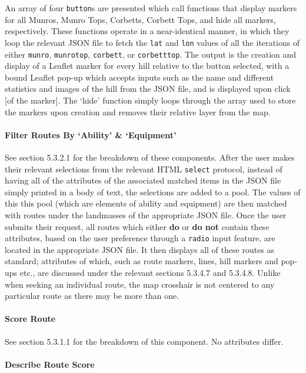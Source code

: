 \documentclass[11pt, english]{article}
\begin{document}
	An array of four \texttt{button}s are presented which call functions that display markers for all Munros, Munro Tops, Corbetts, Corbett Tops, and hide all markers, respectively. These functions operate in a near-identical manner, in which they loop the relevant JSON file to fetch the \texttt{lat} and \texttt{lon} values of all the iterations of either \texttt{munro}, \texttt{munrotop}, \texttt{corbett}, or \texttt{corbetttop}. The output is the creation and display of a Leaflet marker for every hill relative to the button selected, with a bound Leaflet pop-up which accepts inputs such as the name and different statistics and images of the hill from the JSON file, and is displayed upon click [of the marker]. The `hide' function simply loops through the array used to store the markers upon creation and removes their relative layer from the map.

			\paragraph{Filter Routes By `Ability' \& `Equipment'}

	See section 5.3.2.1 for the breakdown of these components. After the user makes their relevant selections from the relevant HTML \texttt{select} protocol, instead of having all of the attributes of the associated matched items in the JSON file simply printed in a body of text, the selections are added to a pool. The values of this this pool (which are elements of ability and equipment) are then matched with routes under the landmasses of the appropriate JSON file. Once the user submits their request, all routes which either \textbf{do} or \textbf{do not} contain these attributes, based on the user preference through a \texttt{radio} input feature, are located in the appropriate JSON file. It then displays all of these routes as standard; attributes of which, such as route markers, lines, hill markers and pop-ups etc., are discussed under the relevant sections 5.3.4.7 and 5.3.4.8. Unlike when seeking an individual route, the map crosshair is not centered to any particular route as there may be more than one.

			\paragraph{Score Route}

	See section 5.3.1.1 for the breakdown of this component. No attributes differ.

			\paragraph{Describe Route Score}
\end{document}
